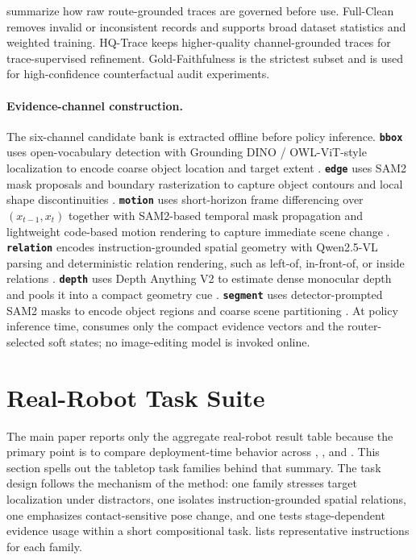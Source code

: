  summarize how raw route-grounded traces are governed before use. Full-Clean removes invalid or inconsistent records and supports broad dataset statistics and weighted training. HQ-Trace keeps higher-quality channel-grounded traces for trace-supervised refinement. Gold-Faithfulness is the strictest subset and is used for high-confidence counterfactual audit experiments.

\paragraph{Evidence-channel construction.}
The six-channel candidate bank is extracted offline before policy inference. \textbf{\texttt{bbox}} uses open-vocabulary detection with Grounding DINO / OWL-ViT-style localization to encode coarse object location and target extent \citep{liu2023groundingdino,minderer2022owlvit}. \textbf{\texttt{edge}} uses SAM2 mask proposals and boundary rasterization to capture object contours and local shape discontinuities \citep{ravi2024sam2}. \textbf{\texttt{motion}} uses short-horizon frame differencing over $(x_{t-1}, x_t)$ together with SAM2-based temporal mask propagation and lightweight code-based motion rendering to capture immediate scene change \citep{ravi2024sam2}. \textbf{\texttt{relation}} encodes instruction-grounded spatial geometry with Qwen2.5-VL parsing and deterministic relation rendering, such as left-of, in-front-of, or inside relations \citep{qwen2025qwen25vl}. \textbf{\texttt{depth}} uses Depth Anything V2 to estimate dense monocular depth and pools it into a compact geometry cue \citep{yang2024depthanythingv2}. \textbf{\texttt{segment}} uses detector-prompted SAM2 masks to encode object regions and coarse scene partitioning \citep{liu2023groundingdino,ravi2024sam2}. At policy inference time, \method{} consumes only the compact evidence vectors and the router-selected soft states; no image-editing model is invoked online.

\section{Real-Robot Task Suite}
\label{subsec:Real-Robot Task Suite}

The main paper reports only the aggregate real-robot result table because the primary point is to compare deployment-time behavior across \basevla{}, \fullsoft{}, and \method{}. This section spells out the tabletop task families behind that summary. The task design follows the mechanism of the method: one family stresses target localization under distractors, one isolates instruction-grounded spatial relations, one emphasizes contact-sensitive pose change, and one tests stage-dependent evidence usage within a short compositional task.  lists representative instructions for each family.


